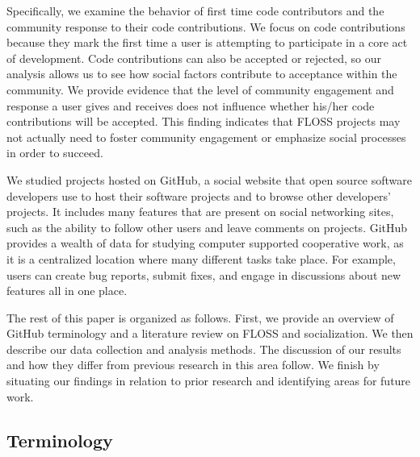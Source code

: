 \documentclass{sigchi}
\begin{document}
Specifically, we examine the behavior of first time
code contributors and the community response to their code contributions. We focus on code contributions because they mark the first time a user is
attempting to participate in a core act of development. Code contributions can
also be accepted or rejected, so our analysis allows us to see how
social factors contribute to acceptance within the community. We provide evidence that the level of community engagement and response a user gives and receives 
does not influence whether his/her code contributions will be accepted. This finding indicates that FLOSS projects may not actually need to foster community 
engagement or emphasize social processes in order to succeed.  

We studied projects hosted on GitHub, a social website that open source software developers use to host
their software projects and to browse other developers' projects. It includes
many features that are present on social networking sites, such as the ability
to follow other users and leave comments on projects. GitHub provides a wealth
of data for studying computer supported cooperative work, as it is a
centralized location where many different tasks take place. For example, users
can create bug reports, submit fixes, and engage in discussions about new
features all in one place.

The rest of this paper is organized as follows. First, we provide an overview of GitHub terminology and a literature review on FLOSS and socialization. We then describe 
our data collection and analysis methods. The discussion of our results and how they differ from previous research in this
area follow. We finish by situating our findings in relation to prior research and identifying areas for future work.


\subsection{Terminology} \label{sec:terms}
\end{document}
